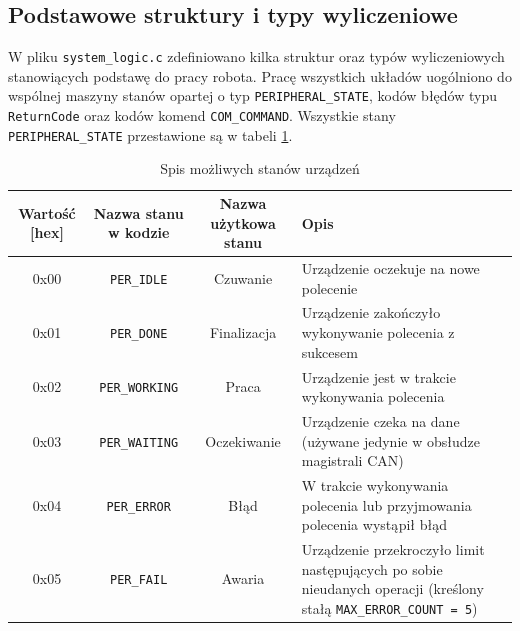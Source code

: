 \subsection{Podstawowe struktury i typy wyliczeniowe}
W pliku \texttt{system\_logic.c} zdefiniowano kilka struktur oraz typów wyliczeniowych stanowiących podstawę do pracy robota. Pracę wszystkich układów uogólniono do wspólnej maszyny stanów opartej o typ \texttt{PERIPHERAL\_STATE}, kodów błędów typu \texttt{ReturnCode} oraz kodów komend \texttt{COM\_COMMAND}. Wszystkie stany \texttt{PERIPHERAL\_STATE} przestawione są w tabeli \ref{tab: per_state}.
    \begin{table}[ht!]
     \centering
      \begin{tabular}{ c | c | c | p{5.5cm}}
            Wartość [hex] & Nazwa stanu w kodzie & Nazwa użytkowa stanu & Opis \\ \hline \hline
            0x00 & \texttt{PER\_IDLE} & Czuwanie & Urządzenie oczekuje na nowe polecenie \\ \hline
            0x01 & \texttt{PER\_DONE} & Finalizacja & Urządzenie zakończyło wykonywanie polecenia z sukcesem \\ \hline
            0x02 & \texttt{PER\_WORKING} & Praca & Urządzenie jest w trakcie wykonywania polecenia \\ \hline
            0x03 & \texttt{PER\_WAITING} & Oczekiwanie & Urządzenie czeka na dane (używane jedynie w obsłudze magistrali CAN) \\ \hline
            0x04 & \texttt{PER\_ERROR} & Błąd & W trakcie wykonywania polecenia lub przyjmowania polecenia wystąpił błąd \\ \hline
            0x05 & \texttt{PER\_FAIL} & Awaria & Urządzenie przekroczyło limit następujących po sobie nieudanych operacji (kreślony stałą \texttt{MAX\_ERROR\_COUNT = 5})
      \end{tabular}
     \caption{\label{tab: per_state} Spis możliwych stanów urządzeń}
    \end{table}

